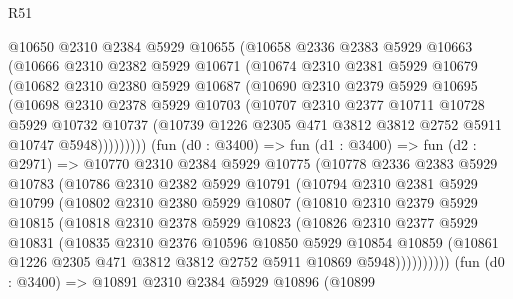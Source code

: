 \begin{lexlean}{R51}
\begin{coremodule}
        @10650
          @2310
          @2384
          @5929
          @10655
          (@10658
            @2336
            @2383
            @5929
            @10663
            (@10666
              @2310
              @2382
              @5929
              @10671
              (@10674
                @2310
                @2381
                @5929
                @10679
                (@10682
                  @2310
                  @2380
                  @5929
                  @10687
                  (@10690
                    @2310
                    @2379
                    @5929
                    @10695
                    (@10698
                      @2310
                      @2378
                      @5929
                      @10703
                      (@10707
                        @2310
                        @2377
                        @10711
                        @10728
                        @5929
                        @10732
                        @10737
                        (@10739 @1226 @2305 @471 @3812 @3812 @2752 @5911 @10747 @5948)))))))))
        (fun (d0 : @3400) =>
        fun (d1 : @3400) =>
        fun (d2 : @2971) =>
        @10770
          @2310
          @2384
          @5929
          @10775
          (@10778
            @2336
            @2383
            @5929
            @10783
            (@10786
              @2310
              @2382
              @5929
              @10791
              (@10794
                @2310
                @2381
                @5929
                @10799
                (@10802
                  @2310
                  @2380
                  @5929
                  @10807
                  (@10810
                    @2310
                    @2379
                    @5929
                    @10815
                    (@10818
                      @2310
                      @2378
                      @5929
                      @10823
                      (@10826
                        @2310
                        @2377
                        @5929
                        @10831
                        (@10835
                          @2310
                          @2376
                          @10596
                          @10850
                          @5929
                          @10854
                          @10859
                          (@10861 @1226 @2305 @471 @3812 @3812 @2752 @5911 @10869 @5948))))))))))
        (fun (d0 : @3400) =>
        @10891
          @2310
          @2384
          @5929
          @10896
          (@10899

\end{coremodule}
\end{lexlean}
